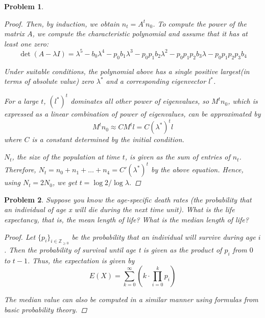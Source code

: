 \documentclass[12pt]{report}
\newtheorem{problem}{Problem}[chapter]
\begin{document}
\begin{problem}
\begin{proof}
            Then, by induction, we obtain $n_t = A^{t}n_0$.
            To compute the power of the matrix $A$, we compute the characteristic polynomial and assume that it has at least one zero:
            \begin{equation*}
                \det{(A-\lambda I)} = \lambda^5 -b_0\lambda^4 -p_0b_1\lambda^3 - p_0p_1b_2\lambda^2 - p_0p_1p_2b_3\lambda - p_0p_1p_2p_3b_4 
            \end{equation*}
            
            Under suitable conditions, the polynomial above has a single positive largest(in terms of absolute value) zero $\lambda^*$ and a corresponding eigenvector $l^*$.

            For a large $t$, $({l^*})^t$ dominates all other power of eigenvalues, so $M^t n_0$, which is expressed as a linear combination of power of eigenvalues, can be approximated by
            \begin{equation*}
                M^{t} n_0 \approx C M^{t} l = C {(\lambda^*)}^t l
            \end{equation*}
            where $C$ is a constant determined by the initial condition.

            $N_t$, the size of the population at time $t$, is given as the sum of entries of $n_t$.
            Therefore, $N_t = n_0 + n_1 + \ldots + n_4 = C' (\lambda^*)^t$ by the above equation.
            Hence, using $N_t = 2N_0$, we get $t = \log{2}/\log{\lambda}$.
        \end{proof}
    \end{problem}

    \begin{problem}
        Suppose you know the age-specific death rates (the probability that an individual of age x will die during the next time unit). What is the life expectancy, that is, the mean length of life? What is the median length of life?

        \begin{proof}
            Let $\{p_i\}_{i \in \mathbb{Z}_{\geq 0}}$ be the probability that an individual will survive during age $i$.
            Then the probability of survival until age t is given as the product of $p_i$ from $0$ to $t-1$.
            Thus, the expectation is given by
            \begin{equation*}
                E(X) = \sum_{k=0}^{\infty} \left( k \cdot \prod_{i=0}^{k}p_i \right)
            \end{equation*}

            The median value can also be computed in a similar manner using formulas from basic probability theory.
        \end{proof}
    \end{problem}
\end{document}
